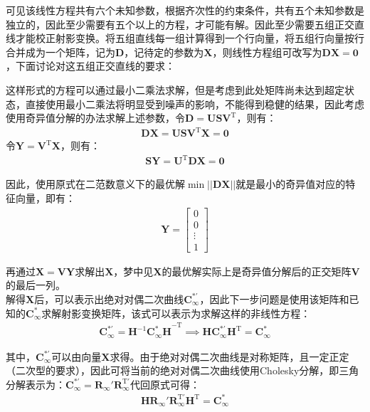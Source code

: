 \documentclass[11pt]{article}
\begin{document}
\par
可见该线性方程共有六个未知参数，根据齐次性的约束条件，共有五个未知参数是独立的，因此至少需要有五个以上的方程，才可能有解。因此至少需要五组正交直线才能校正射影变换。将五组直线每一组计算得到一个行向量，将五组行向量按行合并成为一个矩阵，记为$\mathbf{D}$，记待定的参数为$\mathbf{X}$，则线性方程组可改写为$\mathbf{DX=0}$，下面讨论对这五组正交直线的要求：\par
这样形式的方程可以通过最小二乘法求解，但是考虑到此处矩阵尚未达到超定状态，直接使用最小二乘法将明显受到噪声的影响，不能得到稳健的结果，因此考虑使用奇异值分解的办法求解上述参数，令$\mathbf{D=USV^\mathrm{T}}$，则有：
\begin{align*}
  \mathbf{DX}=\mathbf{USV^\mathrm{T}X}=\mathbf{0}
\end{align*}
令$\mathbf{Y=V^\mathrm{T}X}$，则有：
\begin{align*}
  \mathbf{SY}=\mathbf{U^\mathrm{T}DX}=\mathbf{0}
\end{align*}\par
因此，使用原式在二范数意义下的最优解$\min||\mathbf{DX}||$就是最小的奇异值对应的特征向量，即有：
\begin{align*}
  \mathbf{Y}=\begin{bmatrix}
               0 \\0\\\vdots\\1
             \end{bmatrix}
\end{align*}\par
再通过$\mathbf{X=VY}$求解出$\mathbf{X}$，梦中见$\mathbf{X}$的最优解实际上是奇异值分解后的正交矩阵$\mathbf{V}$的最后一列。\\
解得$\mathbf{X}$后，可以表示出绝对对偶二次曲线$\mathbf{C_\infty^{*'}}$，因此下一步问题是使用该矩阵和已知的$\mathbf{C_\infty^{*}}$求解射影变换矩阵，该式可以表示为求解这样的非线性方程：
\begin{align}
  \mathbf{C_\infty^{*'}}=\mathbf{H}^{-1}\mathbf{C_\infty^*H}^{-\textrm{T}}  \implies\mathbf{H}\mathbf{C_\infty^{*'}}\mathbf{H}^\mathrm{T}=\mathbf{C_\infty^*}
\end{align}\par
其中，$\mathbf{C_\infty^{*'}}$可以由向量$\mathbf{X}$求得。由于绝对对偶二次曲线是对称矩阵，且一定正定（二次型的要求），因此可将当前的绝对对偶二次曲线使用Cholesky分解，即三角分解表示为：$\mathbf{C_\infty^{*'}}=\mathbf{R_\infty' R_\infty^\mathrm{T'}}$代回原式可得：
\begin{align}
  \mathbf{HR_\infty' R_\infty^\mathrm{T'} H^\mathrm{T}=C_\infty^*}
\label{eq:C_infty_SVD}
\end{align}\par
\end{document}
